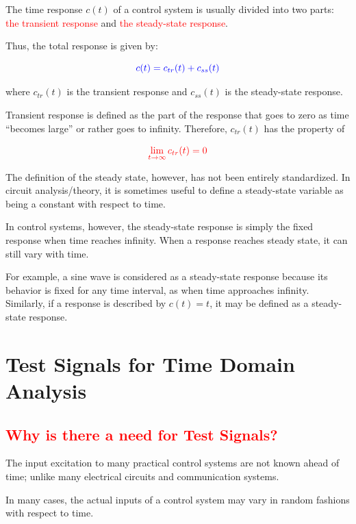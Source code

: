 \documentclass[
  14pt,
  a4paper,
  oneside,
  open=any,
  a4paper,
  14pt]{report}
\begin{document}
The time response \(c(t)\) of a control system is usually divided into
two parts: \textcolor{red}{the transient response} and
\textcolor{red}{the steady-state response}.

Thus, the total response is given by:

\[
    \textcolor{blue}{c(t) = c_{tr}(t) + c_{ss}(t)}
\]

where \(c_{tr}(t)\) is the transient response and \(c_{ss}(t)\) is the
steady-state response.

Transient response is defined as the part of the response that goes to
zero as time ``becomes large'' or rather goes to infinity. Therefore,
\(c_{tr}(t)\) has the property of

\[
    \textcolor{red}{\lim\limits_{t \to \infty} c_{tr}(t) = 0}
\]

The definition of the steady state, however, has not been entirely
standardized. In circuit analysis/theory, it is sometimes useful to
define a steady-state variable as being a constant with respect to time.

In control systems, however, the steady-state response is simply the
fixed response when time reaches infinity. When a response reaches
steady state, it can still vary with time.

For example, a sine wave is considered as a steady-state response
because its behavior is fixed for any time interval, as when time
approaches infinity. Similarly, if a response is described by
\(c(t) = t\), it may be defined as a steady-state response.

\section{Test Signals for Time Domain
Analysis}\label{test-signals-for-time-domain-analysis}

\subsection{\texorpdfstring{\textcolor{red}{Why is there a need for Test
Signals?}}{Why is there a need for Test Signals?}}\label{why-is-there-a-need-for-test-signals}

The input excitation to many practical control systems are not known
ahead of time; unlike many electrical circuits and communication
systems.

In many cases, the actual inputs of a control system may vary in random
fashions with respect to time.
\end{document}
